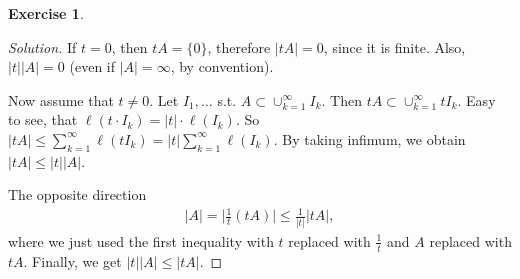 \documentclass[letterpaper, 11pt, english]{article}
\theoremstyle{definition}
\theoremstyle{definition}
\newtheorem{problem}{Exercise}
\theoremstyle{definition}
\newenvironment{sol}{\begin{proof}[Solution]}{\end{proof}}
\theoremstyle{plain} %
\theoremstyle{plain} %
\theoremstyle{plain} %
\theoremstyle{plain} %
\theoremstyle{remark}
\begin{document}
\setcounter{problem}{1}
\begin{problem}
\begin{sol}
    If $ t = 0 $, then $ tA = \{ 0 \} $, therefore $ \lvert tA \rvert = 0 $, since
    it is finite. Also, $ \lvert t \rvert \lvert A \rvert = 0 $
    (even if $ \lvert A \rvert = \infty $, by convention).

    Now assume that $ t \ne 0 $.
    Let $ I_1, \ldots $ s.t.
    $ A \subset \cup_{k=1}^{ \infty} I_k $.
    Then $ tA \subset \cup_{k=1}^{ \infty} t I_k $.
    Easy to see, that $ \ell(t \cdot  I_k) = \lvert t \rvert  \cdot \ell(I_k) $. 
    So $ \lvert t A \rvert \leq \sum_{k=1}^{ \infty} \ell (t I_k) =
    \lvert t \rvert  \sum_{k=1}^{ \infty} \ell (I_k) $. 
    By taking infimum, we obtain
    $ \lvert t A \rvert \leq \lvert t \rvert \lvert A \rvert $.
    
    The opposite direction
    \begin{gather*}
        \lvert A \rvert  = \lvert \frac{1}{t} (tA) \rvert \leq
        \frac{1}{\lvert t \rvert} \lvert tA \rvert,
    \end{gather*}
    where we just used the first inequality with $ t  $ replaced with $ \frac{1}{t} $ and
    $ A $ replaced with $ tA $. Finally, we get
    $ \lvert t \rvert \lvert A \rvert \leq \lvert t A \rvert $.
\end{sol} 
\end{problem}

 
\end{document}
